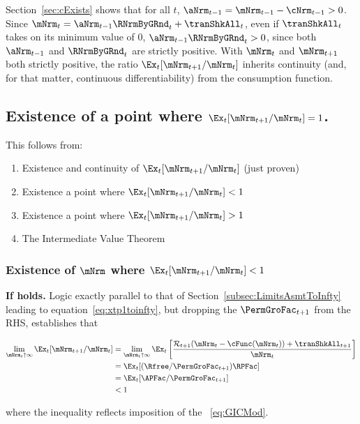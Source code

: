 \documentclass[\econtexRoot/BufferStockTheory]{subfiles}
\begin{document}
Section~\ref{sec:cExists} shows that for all $t$, $\aNrm_{t-1} = {\mNrm}_{t-1} -  \cNrm_{t-1} > 0$.  Since ${\mNrm}_{t}= {\aNrm}_{t-1} \RNrmByGRnd_{t} + \tranShkAll_{t}$, even if $\tranShkAll_{t}$ takes on its minimum value of 0, $\aNrm_{t-1} \RNrmByGRnd_{t} > 0$, since both $\aNrm_{t-1}$ and $\RNrmByGRnd_{t}$ are strictly positive.  With $\mNrm_{t}$ and $\mNrm_{t+1}$ both strictly positive, the ratio $\Ex_t [{\mNrm}_{t+1}/\mNrm_t]$ inherits continuity (and, for that matter, continuous differentiability) from the consumption function.

\subsection{Existence of a point where
  \texorpdfstring{$\Ex_t [{\mNrm}_{t+1}/\mNrm_t]=1$}
  {Ex-t[mNrm-{t+1}/mNrm-{t}]=1}.}

This follows from:
\begin{enumerate}
\item Existence and continuity of $\Ex_t [{\mNrm}_{t+1}/\mNrm_t]$ (just proven)
  \item Existence a point where $\Ex_t [{\mNrm}_{t+1}/\mNrm_t] < 1$
  \item Existence a point where $\Ex_t [{\mNrm}_{t+1}/\mNrm_t] > 1$
    \item The Intermediate Value Theorem
    \end{enumerate}

\subsubsection{Existence of \texorpdfstring{$\mNrm$}{m} where \texorpdfstring{$\Ex_t [{\mNrm}_{t+1}/\mNrm_t] < 1$}{E[m{t+1}/m{t}}}
    
\textbf{If {\RIC} holds.}  Logic exactly parallel to that of Section~\ref{subsec:LimitsAsmtToInfty} leading to equation~\eqref{eq:xtp1toinfty}, but dropping the $\PermGroFac_{t+1}$ from the RHS, establishes that
\begin{samepage}
\begin{align}
  \lim_{\mNrm_{t} \uparrow \infty} \Ex_{t}[{\mNrm}_{t+1}/\mNrm_{t}]  & =   
                                                                       \lim_{\mNrm_{t} \uparrow \infty} 
                                                                       \Ex_{t}\left[\frac{{\mathcal{\mathcal{R}}}_{t+1}(\mNrm_{t}-\cFunc(\mNrm_{t}))+{\tranShkAll}_{t+1}}{\mNrm_{t}}\right] \notag 
  \\  & = \Ex_{t}[(\Rfree/{\PermGroFac}_{t+1})\RPFac]  \notag
  \\  & = \Ex_{t}[{\APFac}/{\PermGroFac}_{t+1}]  \label{eq:emgro}
  \\  & < 1 \notag
\end{align}
\end{samepage}
where the inequality reflects imposition of the \GICMod~\eqref{eq:GICMod}.
\end{document}
